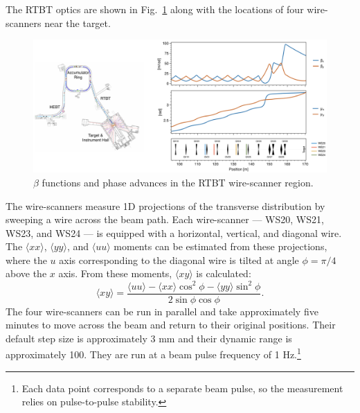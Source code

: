 The RTBT optics are shown in Fig.~\ref{fig:rtbt_optics} along with the locations of four wire-scanners near the target.
%
\begin{figure}[!p]
    \includegraphics[width=\textwidth]{Images/chapter4/RTBT_optics4.png}
    \caption{$\beta$ functions and phase advances in the RTBT wire-scanner region.}
    \label{fig:rtbt_optics}
\end{figure}
%
The wire-scanners measure 1D projections of the transverse distribution by sweeping a wire across the beam path. Each wire-scanner — WS20, WS21, WS23, and WS24 — is equipped with a horizontal, vertical, and diagonal wire. The $\langle{xx}\rangle$, $\langle{yy}\rangle$, and $\langle{uu}\rangle$ moments can be estimated from these projections, where the $u$ axis corresponding to the diagonal wire is tilted at angle $\phi = \pi/4$ above the $x$ axis. From these moments, $\langle{xy}\rangle$ is calculated:
%
\begin{equation}
    \langle{xy}\rangle = \frac{\langle{uu}\rangle - \langle{xx}\rangle \cos^2\phi - \langle{yy}\rangle \sin^2\phi}{2\sin\phi\cos\phi}
    .
\end{equation}
%
The four wire-scanners can be run in parallel and take approximately five minutes to move across the beam and return to their original positions. Their default step size is approximately 3 mm and their dynamic range is approximately 100. They are run at a beam pulse frequency of 1 Hz.\footnote{Each data point corresponds to a separate beam pulse, so the measurement relies on pulse-to-pulse stability.} 

